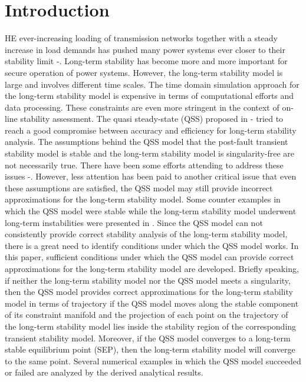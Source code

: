 \documentclass[journal]{IEEEtran}
\begin{document}
\section{Introduction}
HE ever-increasing loading of transmission networks together with a steady increase in load demands has pushed many power systems ever closer to their stability limit \cite{Chiang:book}-\cite{SauerPai:book}. Long-term stability has become more and more important for secure operation of power systems. However, the long-term stability model is large and involves different time scales. The time domain simulation approach for the long-term stability model is expensive in terms of computational efforts and data processing. These constraints are even more stringent in the context of on-line stability assessment.
The quasi steady-state (QSS) proposed in \cite{Cutsem:book}-\cite{Cutsem:artical} tried to reach a good compromise between accuracy and efficiency for long-term stability analysis. The assumptions behind the QSS model that the post-fault transient stability model is stable and the long-term stability model is singularity-free are not necessarily true. There have been some efforts attending to address these issues \cite{Cutsem:artical2}-\cite{Wang:artical}. However, less attention has been paid to another critical issue that even these assumptions are satisfied, the QSS model may still provide incorrect approximations for the long-term stability model. Some counter examples in which the QSS model were stable while the long-term stability model underwent long-term instabilities were presented in \cite{Wangxz:article}. Since the QSS model can not consistently provide correct stability analysis of the long-term stability model, there is a great need to identify conditions under which the QSS model works.
In this paper, sufficient conditions under which the QSS model can provide correct approximations for the long-term stability model are developed. Briefly speaking, if neither the long-term stability model nor the QSS model meets a singularity, then the QSS model provides correct approximations for the long-term stability model in terms of trajectory if the QSS model moves along the stable component of its constraint manifold and the projection of each point on the trajectory of the long-term stability model lies inside the stability region of the corresponding transient stability model. Moreover, if the QSS model converges to a long-term stable equilibrium point (SEP), then the long-term stability model will converge to the same point. Several numerical examples in which the QSS model succeeded or failed are analyzed by the derived analytical results.
\end{document}
